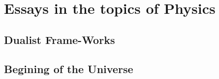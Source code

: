 \chapter{Essays in the topics of Physics}

\section{Dualist Frame-Works}


\section{Begining of the Universe}


